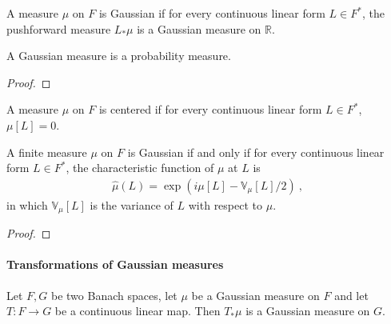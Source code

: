 \begin{definition}\label{def:IsGaussian}
  \mathlibok
A measure $\mu$ on $F$ is Gaussian if for every continuous linear form $L \in F^*$, the pushforward measure $L_* \mu$ is a Gaussian measure on $\mathbb{R}$.
\end{definition}


\begin{lemma}\label{lem:IsGaussian.IsProbabilityMeasure}
  \mathlibok
A Gaussian measure is a probability measure.
\end{lemma}

\begin{proof}\leanok

\end{proof}


\begin{definition}\label{def:IsCentered}
A measure $\mu$ on $F$ is centered if for every continuous linear form $L \in F^*$, $\mu[L] = 0$.
\end{definition}


\begin{theorem}\label{thm:isGaussian_iff_charFunDual_eq}
  \mathlibok
A finite measure $\mu$ on $F$ is Gaussian if and only if for every continuous linear form $L \in F^*$, the characteristic function of $\mu$ at $L$ is
\begin{align*}
  \hat{\mu}(L) = \exp\left(i \mu[L] - \mathbb{V}_\mu[L] / 2\right) \: ,
\end{align*}
in which $\mathbb{V}_\mu[L]$ is the variance of $L$ with respect to $\mu$.
\end{theorem}

\begin{proof}\leanok

\end{proof}



\paragraph{Transformations of Gaussian measures}

\begin{lemma}\label{lem:isGaussian_map}
  \mathlibok
Let $F, G$ be two Banach spaces, let $\mu$ be a Gaussian measure on $F$ and let $T : F \to G$ be a continuous linear map.
Then $T_*\mu$ is a Gaussian measure on $G$.
\end{lemma}

